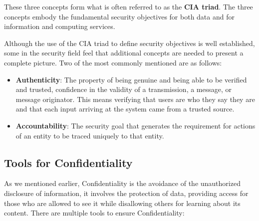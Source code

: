 \documentclass{article}
\begin{document}
These three concepts form what is often referred to as the \textbf{CIA triad}.
The three concepts embody the fundamental security objectives for both data and
for information and computing services.

Although the use of the CIA triad to define security objectives is well
established, some in the security field feel that additional concepts are needed
to present a complete picture. Two of the most commonly mentioned are as
follows:

\begin{itemize}
    \item \textbf{Authenticity}: The property of being genuine and being able to
    be verified and trusted, confidence in the validity of a transmission, a
    message, or message originator. This means verifying that users are who they
    say they are and that each input arriving at the system came from a trusted
    source.
    \item \textbf{Accountability}: The security goal that generates the
    requirement for actions of an entity to be traced uniquely to that entity.
\end{itemize}

\newpage

\subsection{Tools for Confidentiality}

As we mentioned earlier, Confidentiality is the avoidance of the unauthorized disclosure
of information, it involves the protection of data, providing
access for those who are allowed to see it while
disallowing others for learning about its content.
There are multiple tools to ensure Confidentiality:
\end{document}
